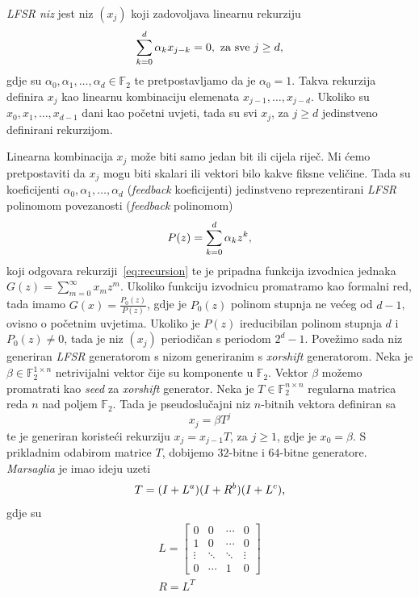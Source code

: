 \documentclass[10pt]{scrartcl}
\newcommand\foreign[1]{\textit{#1}}
\newcommand{\poljef}{\mathbb{F}_2}
\newcommand{\sumk}{\sum_{k=0}^{d}}
\begin{document}
\begin{definicija}
\emph{LFSR niz} jest niz $(x_j)$ koji zadovoljava linearnu rekurziju 
\begin{equation}\label{eq:recursion}
    \sumk \alpha_k x_{j-k} = 0, \text{ za sve } j \geq d\text,
\end{equation}
gdje su $\alpha_0, \alpha_1, \dots , \alpha_d \in \poljef$ te pretpostavljamo da je $\alpha_0 = 1$. Takva rekurzija definira $x_j$ kao linearnu kombinaciju elemenata $x_{j-1}, \dots, x_{j-d}$. Ukoliko su $x_0, x_1, \dots, x_{d-1}$ dani kao početni uvjeti, tada su svi $x_j$, za $j\geq d$ jedinstveno definirani rekurzijom.
\end{definicija}
Linearna kombinacija $x_j$ može biti samo jedan bit ili cijela riječ. Mi ćemo pretpostaviti da $x_j$ mogu biti skalari ili vektori bilo kakve fiksne veličine. Tada su koeficijenti $\alpha_0, \alpha_1, \dots, \alpha_d$ (\foreign{feedback} koeficijenti) jedinstveno re\-pre\-zen\-ti\-ra\-ni \foreign{LFSR} polinomom povezanosti (\foreign{feedback} polinomom)
\begin{equation}
    P(z) = \sumk \alpha_k z^k\text,
\end{equation}
koji odgovara rekurziji~\eqref{eq:recursion} te je pripadna funkcija izvodnica jednaka $G(z) = \sum_{m=0}^{\infty} x_m z^m$. Ukoliko funkciju izvodnicu promatramo kao for\-mal\-ni red, tada imamo $G(x)= \frac{P_0(z)}{P(z)}$, gdje je $P_0(z)$ polinom stupnja ne većeg od $d-1$, ovisno o početnim uvjetima. Ukoliko je $P(z)$ ireducibilan polinom stupnja $d$ i $P_0(z) \neq 0$, tada je niz $(x_j)$ periodičan s periodom $2^d -1$. Povežimo sada niz generiran \foreign{LFSR} generatorom s nizom generiranim s \foreign{xorshift} generatorom.
Neka je $\beta \in \poljef^{1 \times n}$ netrivijalni vektor čije su komponente u $\poljef$. Vektor $\beta$ možemo promatrati kao \foreign{seed} za \foreign{xorshift} generator. Neka je $T \in \poljef^{n\times n}$ regularna matrica reda $n$ nad poljem $\poljef$. Tada je pseudoslučajni niz $n$-bitnih vektora definiran sa
\begin{equation}\label{eq:xj}
x_j = \beta T^j
\end{equation}
te je generiran koristeći rekurziju $x_j = x_{j-1}T$, za $j \geq 1$, gdje je $x_0 = \beta$. S prikladnim odabirom matrice $T$, dobijemo $32$-bitne i $64$-bitne generatore. \foreign{Marsaglia} je imao ideju uzeti 
\begin{equation}
T = (I + L^a)(I + R^b)(I+L^c)\text,
\end{equation}
gdje su
\begin{gather}
L=\begin{bmatrix}
0 & 0 & \cdots & 0 \\
1 & 0 & \cdots & 0 \\
\vdots & \ddots & \ddots & \vdots \\
0 & \cdots & 1 & 0
\end{bmatrix}
\\[2ex]
R = L^T
\end{gather}
\end{document}
